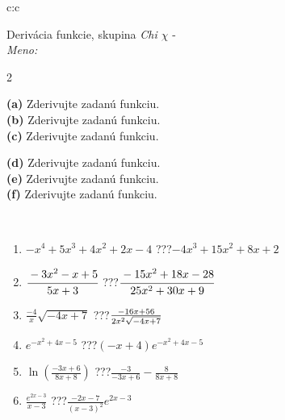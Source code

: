 \documentclass[10pt]{report}
\begin{document}
\newpage
\thispagestyle{empty}
\begin{tabular}{c:c}
\begin{minipage}[c][104.5mm][t]{0.5\linewidth}
\begin{center}
\vspace{7mm}
{\huge Derivácia funkcie, skupina \textit{Chi $\chi$} -}\\[5mm]
\textit{Meno:}\phantom{xxxxxxxxxxxxxxxxxxxxxxxxxxxxxxxxxxxxxxxxxxxxxxxxxxxxxxxxxxxxxxxxx}\\[5mm]
\begin{minipage}{0.95\linewidth}
\begin{center}
{\small \begin{multicols}{2} \raggedright
\textbf{(a)} Zderivujte zadanú funkciu. \\[1mm]
\textbf{(b)} Zderivujte zadanú funkciu. \\[1mm]
\textbf{(c)} Zderivujte zadanú funkciu. \par \columnbreak
\textbf{(d)} Zderivujte zadanú funkciu. \\[1mm]
\textbf{(e)} Zderivujte zadanú funkciu. \\[1mm]
\textbf{(f)} Zderivujte zadanú funkciu.
\end{multicols}
}
\end{center}
\end{minipage}
\\[4mm]
\begin{minipage}{0.79\linewidth}
\begin{center}
\begin{varwidth}{\linewidth}
\begin{enumerate}
\normalsize
\item $-x^4+5x^3+4x^2+2x-4$\quad \dotfill\; ???\;\dotfill \quad $-4x^3+15x^2+8x+2$
\item $\cfrac{-3x^2-x+5}{5x+3}$\quad \dotfill\; ???\;\dotfill \quad $\cfrac{-15x^2+18x-28}{25x^2+30x+9}$
\item $\frac{-4}{x}\sqrt{-4x+7}$\quad \dotfill\; ???\;\dotfill \quad $\frac{-16x+56}{2x^2 \sqrt{\smash[b]{-4x+7}}}$
\item $e^{-x^2+4x-5}$\quad \dotfill\; ???\;\dotfill \quad $(-x+4)e^{-x^2+4x-5}$
\item $\ln{\left(\frac{-3x+6}{8x+8}\right)}$\quad \dotfill\; ???\;\dotfill \quad $\frac{-3}{-3x+6}-\frac{8}{8x+8}$
\item $\frac{e^{2x-3}}{x-3}$\quad \dotfill\; ???\;\dotfill \quad $\frac{-2x-7}{(x-3)^2}e^{2x-3}$
\end{enumerate}

\end{varwidth}
\end{center}
\end{minipage}
\end{center}
\end{minipage}
\end{tabular}
\end{document}
